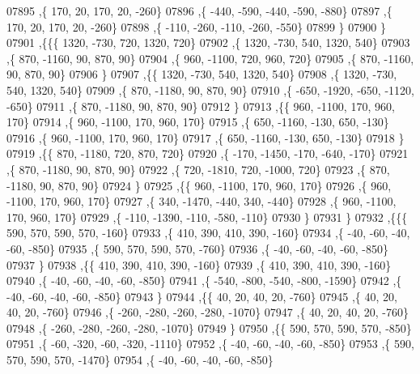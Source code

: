 \begin{DoxyCode}
07895     ,\{   170,    20,   170,    20,  -260\}
07896     ,\{  -440,  -590,  -440,  -590,  -880\}
07897     ,\{   170,    20,   170,    20,  -260\}
07898     ,\{  -110,  -260,  -110,  -260,  -550\}
07899     \}
07900    \}
07901   ,\{\{\{  1320,  -730,   720,  1320,   720\}
07902     ,\{  1320,  -730,   540,  1320,   540\}
07903     ,\{   870, -1160,    90,   870,    90\}
07904     ,\{   960, -1100,   720,   960,   720\}
07905     ,\{   870, -1160,    90,   870,    90\}
07906     \}
07907    ,\{\{  1320,  -730,   540,  1320,   540\}
07908     ,\{  1320,  -730,   540,  1320,   540\}
07909     ,\{   870, -1180,    90,   870,    90\}
07910     ,\{  -650, -1920,  -650, -1120,  -650\}
07911     ,\{   870, -1180,    90,   870,    90\}
07912     \}
07913    ,\{\{   960, -1100,   170,   960,   170\}
07914     ,\{   960, -1100,   170,   960,   170\}
07915     ,\{   650, -1160,  -130,   650,  -130\}
07916     ,\{   960, -1100,   170,   960,   170\}
07917     ,\{   650, -1160,  -130,   650,  -130\}
07918     \}
07919    ,\{\{   870, -1180,   720,   870,   720\}
07920     ,\{  -170, -1450,  -170,  -640,  -170\}
07921     ,\{   870, -1180,    90,   870,    90\}
07922     ,\{   720, -1810,   720, -1000,   720\}
07923     ,\{   870, -1180,    90,   870,    90\}
07924     \}
07925    ,\{\{   960, -1100,   170,   960,   170\}
07926     ,\{   960, -1100,   170,   960,   170\}
07927     ,\{   340, -1470,  -440,   340,  -440\}
07928     ,\{   960, -1100,   170,   960,   170\}
07929     ,\{  -110, -1390,  -110,  -580,  -110\}
07930     \}
07931    \}
07932   ,\{\{\{   590,   570,   590,   570,  -160\}
07933     ,\{   410,   390,   410,   390,  -160\}
07934     ,\{   -40,   -60,   -40,   -60,  -850\}
07935     ,\{   590,   570,   590,   570,  -760\}
07936     ,\{   -40,   -60,   -40,   -60,  -850\}
07937     \}
07938    ,\{\{   410,   390,   410,   390,  -160\}
07939     ,\{   410,   390,   410,   390,  -160\}
07940     ,\{   -40,   -60,   -40,   -60,  -850\}
07941     ,\{  -540,  -800,  -540,  -800, -1590\}
07942     ,\{   -40,   -60,   -40,   -60,  -850\}
07943     \}
07944    ,\{\{    40,    20,    40,    20,  -760\}
07945     ,\{    40,    20,    40,    20,  -760\}
07946     ,\{  -260,  -280,  -260,  -280, -1070\}
07947     ,\{    40,    20,    40,    20,  -760\}
07948     ,\{  -260,  -280,  -260,  -280, -1070\}
07949     \}
07950    ,\{\{   590,   570,   590,   570,  -850\}
07951     ,\{   -60,  -320,   -60,  -320, -1110\}
07952     ,\{   -40,   -60,   -40,   -60,  -850\}
07953     ,\{   590,   570,   590,   570, -1470\}
07954     ,\{   -40,   -60,   -40,   -60,  -850\}

\end{DoxyCode}
